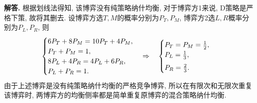 \documentclass[12pt, a4paper, oneside]{ctexart}
\newenvironment{solution}{\par\noindent\textbf{解答. }}{\bigskip\par}
\def\add{\vspace{1ex}}  %
\begin{document}
\begin{solution}
    根据划线法得知, 该博弈没有纯策略纳什均衡, 对于博弈方1来说, D策略是严格下策, 故将其删去. 设博弈方选$T, M$的概率分别为$P_T, P_M$, 博弈方2选$L, R$概率分别为$P_L, P_R$, 则
    \begin{equation*}
        \begin{cases}
            6P_T+8P_M = 10P_T+4P_M,\\
            P_T+P_M = 1,\\
            8P_L+4P_R=4P_L+6P_R,\\
            P_L+P_R = 1.
        \end{cases}
        \Rightarrow\quad\begin{cases}
            P_T = P_M = \frac{1}{2},\\
            P_L = \frac{1}{3},\add\\
            P_R = \frac{2}{3}.
        \end{cases}
    \end{equation*}
    由于上述博弈是没有纯策略纳什均衡的严格竞争博弈, 所以在有限次和无限次重复该博弈时, 两博弈方的均衡侧率都是简单重复原博弈的混合策略纳什均衡.
\end{solution}

\end{document}
